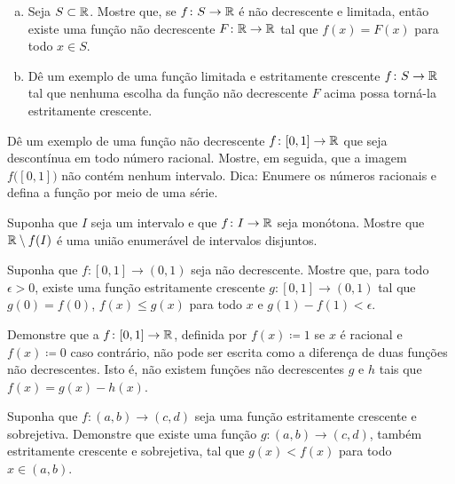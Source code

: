 \begin{exercise}
\leavevmode
\begin{enumerate}[a)]
\item
Seja $S \subset {\mathbb{R}}$. Mostre que, se $f \colon S \to {\mathbb{R}}$ é não decrescente e
limitada,
então existe uma função não decrescente $F \colon {\mathbb{R}} \to {\mathbb{R}}$
tal que $f(x) = F(x)$ para todo $x \in S$.
\item
Dê um exemplo de uma função limitada e estritamente crescente $f \colon S \to {\mathbb{R}}$ tal que
nenhuma escolha da função não decrescente $F$ acima possa torná-la estritamente crescente.
\end{enumerate}
\end{exercise}

\begin{exercise}[Desafiador] \label{exercise:increasingfuncdiscatQ}
Dê um exemplo de uma função não decrescente $f \colon [0,1] \to {\mathbb{R}}$
que seja descontínua em todo número racional. Mostre, em seguida, que a imagem
$f\bigl([0,1]\bigr)$ não contém nenhum intervalo. Dica: Enumere
os números racionais e defina a função por meio de uma série.
\end{exercise}

\begin{exercise}
Suponha que $I$ seja um intervalo e que $f \colon I \to {\mathbb{R}}$ seja monótona.
Mostre que ${\mathbb{R}} \setminus f(I)$ é uma união enumerável de intervalos disjuntos.
\end{exercise}

\begin{exercise}
Suponha que $f \colon [0,1] \to (0,1)$ seja não decrescente. Mostre que, para todo
$\epsilon > 0$, existe uma função estritamente crescente
$g \colon [0,1] \to (0,1)$ tal que
$g(0) = f(0)$, $f(x) \leq g(x)$ para todo $x$ e $g(1)-f(1) < \epsilon$.
\end{exercise}

\begin{exercise}
Demonstre que a 
$f \colon [0,1] \to{\mathbb{R}}$, definida por $f(x) \coloneqq 1$
se $x$ é racional e $f(x) \coloneqq 0$ caso contrário, não pode ser escrita como a
diferença de duas funções não decrescentes. Isto é, não existem funções não decrescentes
$g$ e $h$ tais que $f(x) = g(x) - h(x)$.
\end{exercise}

\begin{exercise}
Suponha que $f \colon (a,b) \to (c,d)$ seja uma função estritamente crescente
e sobrejetiva. Demonstre que existe uma função $g \colon (a,b) \to (c,d)$,
também estritamente crescente e sobrejetiva, tal que $g(x) < f(x)$ para todo $x \in
(a,b)$.
\end{exercise}


